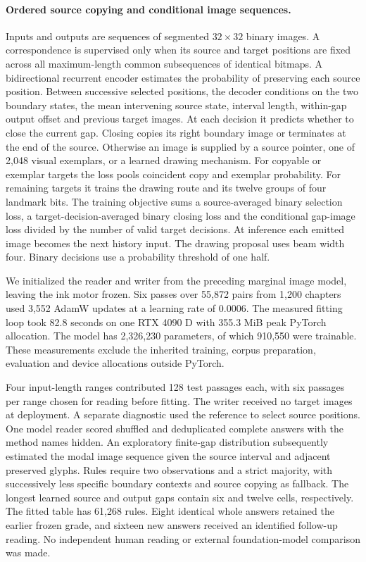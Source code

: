 \documentclass[12pt,a4paper]{article}
\providecommand{\DIFadd}[1]{{\protect\color{blue} \sf #1}} %
\begin{document}
\paragraph{\DIFadd{Ordered source copying and conditional image sequences.}}
\DIFadd{Inputs and outputs are sequences of segmented $32\times32$ binary images. A correspondence is supervised only when its source and target positions are fixed across all maximum-length common subsequences of identical bitmaps. A bidirectional recurrent encoder estimates the probability of preserving each source position. Between successive selected positions, the decoder conditions on the two boundary states, the mean intervening source state, interval length, within-gap output offset and previous target images. At each decision it predicts whether to close the current gap. Closing copies its right boundary image or terminates at the end of the source. Otherwise an image is supplied by a source pointer, one of 2,048 visual exemplars, or a learned drawing mechanism. For copyable or exemplar targets the loss pools coincident copy and exemplar probability. For remaining targets it trains the drawing route and its twelve groups of four landmark bits. The training objective sums a source-averaged binary selection loss, a target-decision-averaged binary closing loss and the conditional gap-image loss divided by the number of valid target decisions. At inference each emitted image becomes the next history input. The drawing proposal uses beam width four. Binary decisions use a probability threshold of one half.
}

\DIFadd{We initialized the reader and writer from the preceding marginal image model, leaving the ink motor frozen. Six passes over 55,872 pairs from 1,200 chapters used 3,552 AdamW updates at a learning rate of 0.0006. The measured fitting loop took 82.8 seconds on one RTX 4090 D with 355.3 MiB peak PyTorch allocation. The model has 2,326,230 parameters, of which 910,550 were trainable. These measurements exclude the inherited training, corpus preparation, evaluation and device allocations outside PyTorch.
}

\DIFadd{Four input-length ranges contributed 128 test passages each, with six passages per range chosen for reading before fitting. The writer received no target images at deployment. A separate diagnostic used the reference to select source positions. One model reader scored shuffled and deduplicated complete answers with the method names hidden. An exploratory finite-gap distribution subsequently estimated the modal image sequence given the source interval and adjacent preserved glyphs. Rules require two observations and a strict majority, with successively less specific boundary contexts and source copying as fallback. The longest learned source and output gaps contain six and twelve cells, respectively. The fitted table has 61,268 rules. Eight identical whole answers retained the earlier frozen grade, and sixteen new answers received an identified follow-up reading. No independent human reading or external foundation-model comparison was made.
}
\end{document}
